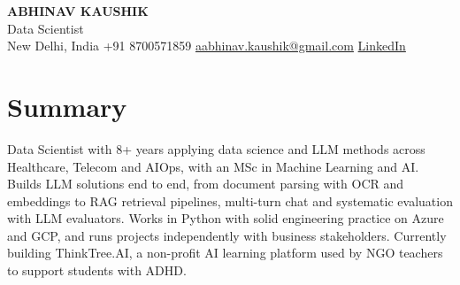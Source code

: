 \documentclass[10pt,a4paper]{article}
\begin{document}
\begin{center}
  {\LARGE\bfseries ABHINAV KAUSHIK}\\[2pt]
  {\large Data Scientist}\\[2pt]
  New Delhi, India \textbar{} +91 8700571859 \textbar{} \href{mailto:aabhinav.kaushik@gmail.com}{aabhinav.kaushik@gmail.com} \textbar{} \href{https://www.linkedin.com/in/abhinav-kaushik10/}{LinkedIn}  
\end{center}

\section{Summary}
Data Scientist with 8+ years applying data science and LLM methods across Healthcare, Telecom and AIOps, with an MSc in Machine Learning and AI. Builds LLM solutions end to end, from document parsing with OCR and embeddings to RAG retrieval pipelines, multi-turn chat and systematic evaluation with LLM evaluators. Works in Python with solid engineering practice on Azure and GCP, and runs projects independently with business stakeholders. Currently building ThinkTree.AI, a non-profit AI learning platform used by NGO teachers to support students with ADHD.
\end{document}
